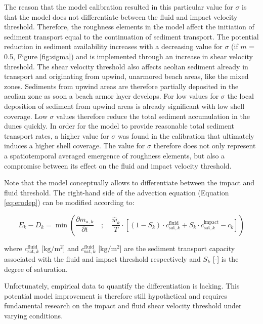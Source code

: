 \documentclass[preprint,12pt,authoryear]{elsarticle}
\begin{document}
The reason that the model calibration resulted in this particular
value for $\sigma$ is that the model does not differentiate between
the fluid and impact velocity threshold.  Therefore, the roughness
elements in the model affect the initiation of sediment transport
equal to the continuation of sediment transport. The potential
reduction in sediment availability increases with a decreasing value
for $\sigma$ (if $m$ = 0.5, Figure \ref{fig:sigma}) and is implemented
through an increase in shear velocity threshold. The shear velocity
threshold also affects aeolian sediment already in transport and
originating from upwind, unarmored beach areas, like the mixed
zones. Sediments from upwind areas are therefore partially deposited
in the aeolian zone as soon a beach armor layer develops. For low
values for $\sigma$ the local deposition of sediment from upwind areas
is already significant with low shell coverage. Low $\sigma$ values
therefore reduce the total sediment accumulation in the dunes
quickly. In order for the model to provide reasonable total sediment
transport rates, a higher value for $\sigma$ was found in the
calibration that ultimately induces a higher shell coverage. The value
for $\sigma$ therefore does not only represent a spatiotemporal
averaged emergence of roughness elements, but also a compromise
between its effect on the fluid and impact velocity threshold.

Note that the model conceptually allows to differentiate between the
impact and fluid threshold. The right-hand side of the advection
equation (Equation \ref{eq:erodep}) can be modified according to:

\begin{equation}
  \label{eq:erodep_split}
  E_k - D_k = \min \left( 
  \frac{\partial m_{\mathrm{a},k}}{\partial t} \quad ; \quad 
  \frac{\hat{w}_k}{T} \cdot \left[
    (1 - S_k) \cdot c^{\mathrm{fluid}}_{\mathrm{sat},k} +
    S_k \cdot c^{\mathrm{impact}}_{\mathrm{sat},k} - c_k
    \right]
  \right)
\end{equation}

\noindent where $c^{\mathrm{fluid}}_{\mathrm{sat},k}$
[$\mathrm{kg/m^2}$] and $c^{\mathrm{fluid}}_{\mathrm{sat},k}$
[$\mathrm{kg/m^2}$] are the sediment transport capacity associated
with the fluid and impact threshold respectively and $S_k$ [-] is the
degree of saturation.

Unfortunately, empirical data to quantify the differentiation is
lacking. This potential model improvement is therefore still
hypothetical and requires fundamental research on the impact and fluid
shear velocity threshold under varying conditions.
\end{document}
